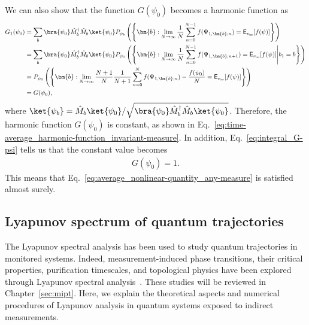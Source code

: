 \documentclass[preprint,pteplogo]{ptephy_v2}%
\numberwithin{equation}{section}
\theoremstyle{definition}
\begin{document}
We can also show that the function $G(\psi_0)$ becomes a harmonic function as
\begin{align}
    G_1(\psi_0)&=\sum_b
    \bra{\psi_0}\hat{M}_b^\dagger\hat{M}_b\ket{\psi_0}
    P_{\psi_b}\left(\left\{\bm{b}:
    \lim_{N\rightarrow\infty}\frac{1}{N}
    \sum_{n=0}^{N-1}f(\Psi_{1,\bm{b};n})
    =\mathsf{E}_{\nu_\mathrm{ss}}[f(\psi)]
    \right\}\right)\nonumber\\
    &=\sum_b
    \bra{\psi_0}\hat{M}_b^\dagger\hat{M}_b\ket{\psi_0}
    P_{\psi_0}\left(\left\{\bm{b}:
    \lim_{N\rightarrow\infty}\frac{1}{N}
    \sum_{n=0}^{N-1}f(\Psi_{1,\bm{b};{n+1}})
    =\mathsf{E}_{\nu_\mathrm{ss}}[f(\psi)]\middle|b_1=b\right\}\right)\nonumber\\
    &=P_{\psi_0}\left(\left\{\bm{b}:
    \lim_{N\rightarrow\infty}\frac{N+1}{N}\frac{1}{N+1}
    \sum_{n=0}^{N}f(\Psi_{1,\bm{b};n})-\frac{f(\psi_0)}{N}
    =\mathsf{E}_{\nu_\mathrm{ss}}[f(\psi)]\right\}\right)\nonumber\\
    &=G(\psi_0),
\end{align}
where $\ket{\psi_b}=\hat{M}_b\ket{\psi_0}/\sqrt{\bra{\psi_0}\hat{M}_b^\dagger\hat{M}_b\ket{\psi_0}}$. 
Therefore, the harmonic function $G(\psi_0)$ is constant, as shown in Eq.~\eqref{eq:time-average_harmonic-function_invariant-measure}. 
In addition, Eq.~\eqref{eq:integral_G-psi} tells us that the constant value becomes
\begin{align}
    G(\psi_0)=1.
\end{align}
This means that Eq.~\eqref{eq:average_nonlinear-quantity_any-measure} is satisfied almost surely.


\subsection{Lyapunov spectrum of quantum trajectories}
\label{sec:Lyapunov-analysis}
The Lyapunov spectral analysis has been used to study quantum trajectories in monitored systems. 
Indeed, measurement-induced phase transitions, their critical properties, purification timescales, and topological physics have been explored through Lyapunov spectral analysis~\cite{zabalo2022operator, kumar2024boundary, aziz2024critical, chakraborty24charge, bulchandani2024random, mochizuki2025measurement, xiao2024topology, oshima2025topology, mochizuki2025transitions}. 
These studies will be reviewed in Chapter~\ref{sec:mipt}. 
Here, we explain the theoretical aspects and numerical procedures of Lyapunov analysis in quantum systems exposed to indirect measurements. 
\end{document}
